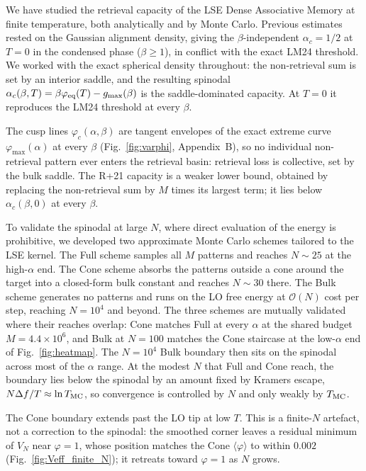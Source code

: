\documentclass[letterpaper]{article} %
\newcommand{\avg}[1]{\langle #1 \rangle}
\newcommand{\Bnet}{\beta}
\newcommand{\ac}{\alpha_c}
\begin{document}
We have studied the retrieval capacity of the LSE Dense Associative Memory at finite temperature, both analytically and by Monte Carlo. Previous estimates rested on the Gaussian alignment density, giving the $\Bnet$-independent $\ac = 1/2$ at $T = 0$ in the condensed phase ($\Bnet \geq 1$), in conflict with the exact LM24 threshold. We worked with the exact spherical density throughout: the non-retrieval sum is set by an interior saddle, and the resulting spinodal $\ac(\Bnet, T) = \Bnet \varphi_{\rm eq}(T) - g_{\max}(\Bnet)$ is the saddle-dominated capacity. At $T = 0$ it reproduces the LM24 threshold at every $\Bnet$.

The cusp lines $\varphi_c(\alpha, \Bnet)$ are tangent envelopes of the exact extreme curve $\varphi_{\max}(\alpha)$ at every $\Bnet$ (Fig.~\ref{fig:varphi}, Appendix~B), so no individual non-retrieval pattern ever enters the retrieval basin: retrieval loss is collective, set by the bulk saddle. The R+21 capacity is a weaker lower bound, obtained by replacing the non-retrieval sum by $M$ times its largest term; it lies below $\ac(\Bnet, 0)$ at every $\Bnet$.

To validate the spinodal at large $N$, where direct evaluation of the energy is prohibitive, we developed two approximate Monte Carlo schemes tailored to the LSE kernel. The Full scheme samples all $M$ patterns and reaches $N \sim 25$ at the high-$\alpha$ end. The Cone scheme absorbs the patterns outside a cone around the target into a closed-form bulk constant and reaches $N \sim 30$ there. The Bulk scheme generates no patterns and runs on the LO free energy at $\mathcal{O}(N)$ cost per step, reaching $N = 10^4$ and beyond. The three schemes are mutually validated where their reaches overlap: Cone matches Full at every $\alpha$ at the shared budget $M = 4.4 \times 10^6$, and Bulk at $N = 100$ matches the Cone staircase at the low-$\alpha$ end of Fig.~\ref{fig:heatmap}. The $N = 10^4$ Bulk boundary then sits on the spinodal across most of the $\alpha$ range. At the modest $N$ that Full and Cone reach, the boundary lies below the spinodal by an amount fixed by Kramers escape, $N \Delta f / T \approx \ln T_{\rm MC}$, so convergence is controlled by $N$ and only weakly by $T_{\rm MC}$.

The Cone boundary extends past the LO tip at low $T$. This is a finite-$N$ artefact, not a correction to the spinodal: the smoothed corner leaves a residual minimum of $V_N$ near $\varphi = 1$, whose position matches the Cone $\avg{\varphi}$ to within $0.002$ (Fig.~\ref{fig:Veff_finite_N}); it retreats toward $\varphi = 1$ as $N$ grows.
\end{document}
